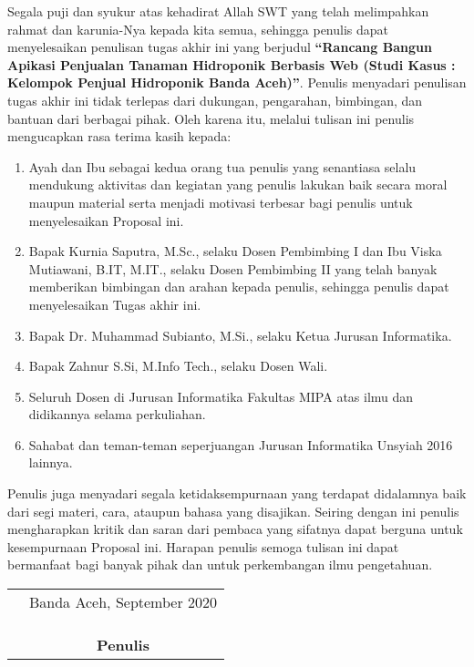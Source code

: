 \preface %


Segala puji dan syukur atas kehadirat Allah SWT yang telah melimpahkan rahmat dan karunia-Nya kepada kita semua, sehingga penulis dapat menyelesaikan penulisan tugas akhir ini yang berjudul \textbf{“Rancang Bangun Apikasi Penjualan Tanaman Hidroponik Berbasis Web (Studi Kasus : Kelompok Penjual Hidroponik Banda Aceh)”}. Penulis menyadari penulisan tugas akhir ini tidak terlepas dari dukungan, pengarahan, bimbingan, dan bantuan dari berbagai pihak. Oleh karena itu, melalui tulisan ini penulis mengucapkan rasa terima kasih kepada:

\begin{enumerate}
	\item{Ayah dan Ibu sebagai kedua orang tua penulis yang senantiasa selalu mendukung aktivitas dan kegiatan yang penulis lakukan baik secara moral maupun material serta menjadi motivasi terbesar bagi penulis untuk menyelesaikan Proposal ini.}
	\item{Bapak Kurnia Saputra, M.Sc., selaku Dosen Pembimbing I dan Ibu Viska Mutiawani, B.IT, M.IT., selaku Dosen Pembimbing II yang telah banyak memberikan bimbingan dan arahan kepada penulis, sehingga penulis dapat menyelesaikan Tugas akhir ini.}
	\item {Bapak Dr. Muhammad Subianto, M.Si., selaku Ketua Jurusan Informatika.}
	\item{Bapak Zahnur S.Si, M.Info Tech., selaku Dosen Wali.}
	\item{Seluruh Dosen di Jurusan Informatika Fakultas MIPA atas ilmu dan didikannya selama perkuliahan.}
	\item{Sahabat dan teman-teman seperjuangan Jurusan Informatika Unsyiah 2016 lainnya.}
\end{enumerate}


Penulis juga menyadari segala ketidaksempurnaan yang terdapat didalamnya baik dari segi materi, cara, ataupun bahasa yang disajikan. Seiring dengan ini penulis mengharapkan kritik dan saran dari pembaca yang sifatnya dapat berguna untuk kesempurnaan Proposal ini. Harapan penulis semoga tulisan ini dapat bermanfaat bagi banyak pihak dan untuk perkembangan ilmu pengetahuan.

\vspace{1cm}


\begin{tabular}{p{7.5cm}c}
	&Banda Aceh, September 2020\\
	&\\
	&\\
	&\\
	&\textbf{Penulis}
\end{tabular}